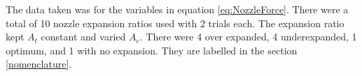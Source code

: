 The data taken was for the variables in equation \ref{eq:NozzleForce}. There were a total of 10 nozzle expansion ratios used with 2 trials each. The expansion ratio kept $A_t$ constant and varied $A_e$. There were 4 over expanded, 4 underexpanded, 1 optimum, and 1 with no expansion. They are labelled in the section \ref{nomenclature}.